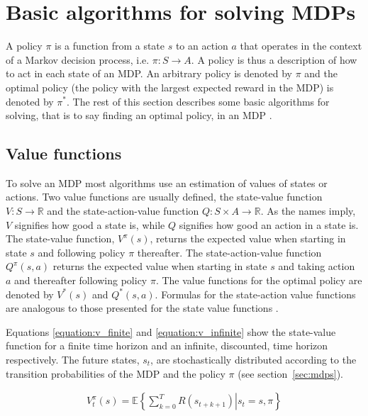 \section{Basic algorithms for solving MDPs}

A policy $\pi$ is a function from a state $s$ to an action $a$ that operates in
the context of a Markov decision process, i.e. $\pi \colon S \to A$. A policy
is thus a description of how to act in each state of an MDP. An arbitrary
policy is denoted by $\pi$ and the optimal policy (the policy with the largest
expected reward in the MDP) is denoted by $\pi^*$. The rest of this section
describes some basic algorithms for solving, that is to say finding an optimal
policy, in an MDP \parencite{barto1998reinforcement}.

\subsection{Value functions}

To solve an MDP most algorithms use an estimation of values of states or
actions. Two value functions are usually defined, the state-value function $V :
S \to \mathbb R$ and the state-action-value function $Q : S \times A \to
\mathbb R$. As the names imply, $V$ signifies how good a state is, while $Q$
signifies how good an action in a state is. The state-value function,
$V^\pi(s)$, returns the expected value when starting in state $s$ and following
policy $\pi$ thereafter. The state-action-value function $Q^\pi(s, a)$ returns
the expected value when starting in state $s$ and taking action $a$ and
thereafter following policy $\pi$. The value functions for the optimal policy
are denoted by $V^*(s)$ and $Q^*(s, a)$. Formulas for the state-action value
functions are analogous to those presented for the state value functions
\parencite{barto1998reinforcement}. 

Equations \eqref{equation:v_finite} and \eqref{equation:v_infinite} show the
state-value function for a finite time horizon and an infinite, discounted,
time horizon respectively. The future states, $s_t$, are stochastically
distributed according to the transition probabilities of the MDP and the policy
$\pi$ (see section~\ref{sec:mdps}).

\begin{align}
\label{equation:v_finite}
V_t^\pi(s) = \mathbb{E} \left\{
  \left. \sum^{T}_{k=0} R(s_{t+k+1})
  \right\vert s_t = s, \pi
\right\}
\end{align}

